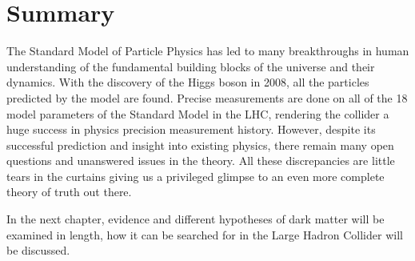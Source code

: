 \section{Summary}
The Standard Model of Particle Physics has led to many breakthroughs in human understanding of the fundamental building blocks of the universe and their dynamics. With the discovery of the Higgs boson in 2008, all the particles predicted by the model are found. Precise measurements are done on all of the 18 model parameters of the Standard Model in the LHC, rendering the collider a huge success in physics precision measurement history. However, despite its successful prediction and insight into
existing physics, there remain many open questions and unanswered issues in the theory. All these discrepancies are little tears in the curtains giving us a privileged glimpse to an even more complete theory of truth out there.

In the next chapter, evidence and different hypotheses of dark matter will be examined in length, how it can be searched for in the Large Hadron Collider will be discussed. 



%



